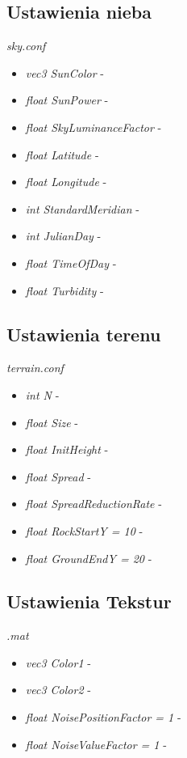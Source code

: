 \documentclass[inz,longabstract]{iithesis}
\begin{document}
        \subsection{Ustawienia nieba}
        \textit{sky.conf}
        \begin{itemize}
            \item \textit{vec3 SunColor} -
            \item \textit{float SunPower} -
            \item \textit{float SkyLuminanceFactor} -
            \item \textit{float Latitude} -
            \item \textit{float Longitude} -
            \item \textit{int StandardMeridian} -
            \item \textit{int JulianDay} -
            \item \textit{float TimeOfDay} -
            \item \textit{float Turbidity} -
        \end{itemize}
        
        \subsection{Ustawienia terenu}
        \textit{terrain.conf}
        \begin{itemize}
            \item \textit{int N} -
            \item \textit{float Size} -
            \item \textit{float InitHeight} -
            \item \textit{float Spread} -
            \item \textit{float SpreadReductionRate} -
            \item \textit{float RockStartY = 10} -
            \item \textit{float GroundEndY = 20} -
        \end{itemize}
        
        \subsection{Ustawienia Tekstur}
        \textit{.mat}
        \begin{itemize}
            \item \textit{vec3 Color1} -
            \item \textit{vec3 Color2} -
            \item \textit{float NoisePositionFactor = 1} -
            \item \textit{float NoiseValueFactor = 1} -
        \end{itemize}
        
\end{document}
